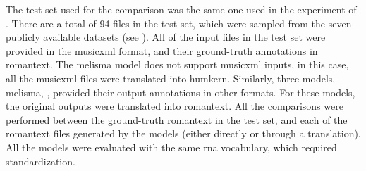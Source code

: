 
The test set used for the comparison was the same one used
in the experiment of
. There are a total
of 94 files in the test set, which were sampled from the
seven publicly available datasets (see
). All of the input files
in the test set were provided in the \gls{musicxml} format,
and their ground-truth annotations in \gls{romantext}. The
\gls{melisma} model does not support \gls{musicxml} inputs,
in this case, all the \gls{musicxml} files were translated
into \gls{humkern}. Similarly, three models, \gls{melisma},
\textcite{chen2021attend, mcleod2021modular}, provided their
output annotations in other formats. For these models, the
original outputs were translated into \gls{romantext}. All
the comparisons were performed between the ground-truth
\gls{romantext} in the test set, and each of the
\gls{romantext} files generated by the models (either
directly or through a translation). All the models were
evaluated with the same \gls{rna} vocabulary, which required
standardization.


